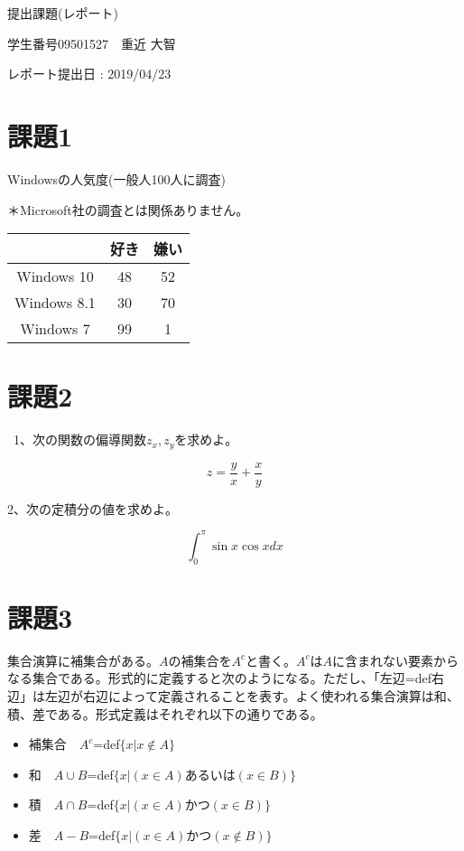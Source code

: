 \documentclass[11pt]{jarticle}
\begin{document}
\begin{center}
提出課題(レポート)

学生番号09501527　重近 大智

レポート提出日 : 2019/04/23
\end{center}
\section{課題1}
Windowsの人気度(一般人100人に調査)

＊Microsoft社の調査とは関係ありません。

\begin{tabular}{|c|c|c|}
\hline
      &好き&嫌い\\
\hline
Windows 10&48&52\\

Windows 8.1&30&70\\

Windows 7&99&1\\
\hline

\end{tabular}
\section{課題2}
\
1、次の関数の偏導関数$z_x ,z_y$を求めよ。
\begin{center}
\begin{equation}
z=\frac{y}{x}+\frac{x}{y}
\end{equation}
\end{center}

2、次の定積分の値を求めよ。
\begin{center}
\begin{equation}
\int_0^π {\sin x \cos xdx}
\end{equation}
\end{center}
\section{課題3}
集合演算に補集合がある。$A$の補集合を$A^c$と書く。$A^c$は$A$に含まれない要素からなる集合である。形式的に定義すると次のようになる。ただし、「左辺=def右辺」は左辺が右辺によって定義されることを表す。よく使われる集合演算は和、積、差である。形式定義はそれぞれ以下の通りである。
\begin{itemize}
\item 補集合　$A^c$=def$\{x|x \notin A\}$
\item 和　$A \cup B$=def$\{x|(x \in A)あるいは(x \in B)\}$
\item 積　$A \cap B$=def$\{x|(x \in A)かつ(x \in B)\}$
\item 差　$A-B$=def$\{x|(x \in A)かつ(x \notin B)\}$


\end{itemize}
\end{document}
